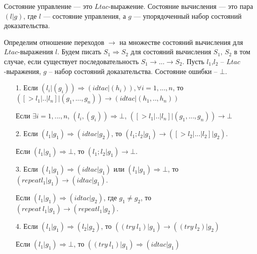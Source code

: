 \documentclass[12pt]{article}
\begin{document}
Состояние управление — это  $Ltac$-выражение. Состояние вычисления — это пара $(l | g)$, где $l$ — состояние управления, а $g$ — упорядоченный набор состояний доказательства.

Определим отношение переходов $\xrightarrow{}$ на множестве состояний вычисления для $Ltac$-выражения $l$.
Будем писать $S_1 \Rightarrow S_2$ для состояний вычисления $S_1$, $S_2$ в том случае, если существует последовательность $S_1 \xrightarrow{} ... \xrightarrow{} S_2$.
Пусть $l_1$,$l_2$ -- $Ltac$-выражения, $g$ -- набор состояний доказательства. Состояние ошибки -- $\bot$.

\begin{enumerate}
    \item[1.] Если  $(l_i|(g_i)) \Rightarrow (idtac|(h_i)), \forall i = 1,...,n$, то $([>l_1|..|l_n]|(g_1,...,g_n)) \xrightarrow{} (idtac|(h_1,..,h_n))$
    \item[  ] Если $\exists i=1,...,n$, $(l_i, (g_i)) \Rightarrow \bot$, $([>l_1|..|l_n]|(g_1,...,g_n)) \xrightarrow{} \bot$
    \item[2.] Если $(l_1|g_1) \Rightarrow (idtac|g_2)$, то $(l_1;l_2|g_1) \xrightarrow{} ([>l_2|...|l_2]|g_2)$.
    \item[  ] Если $(l_1|g_1) \Rightarrow \bot$, то $(l_1;l_2|g_1) \xrightarrow{} \bot$.
    \item[3.] Если $(l_1|g_1) \Rightarrow (idtac|g_1)$ или $(l_1|g_1) \Rightarrow \bot$, то $(repeat l_1|g_1) \xrightarrow{} (idtac|g_1)$.
    \item[  ] Если $(l_1|g_1) \Rightarrow (idtac|g_2)$, где $g_1 \neq g_2$, то $(repeat\ l_1|g_1) \xrightarrow{} (repeat l_1|g_2)$.
    
    \item[4.] Если $(l_1|g_1) \Rightarrow (l_2|g_2)$, то
    $((try\ l_1)| g_1) \xrightarrow{} ((try\ l_2)| g_2)$
    \item[]   Если $(l_1|g_1) \Rightarrow{} \bot$, то
    $((try\ l_1)| g_1) \Rightarrow{} (idtac| g_1)$
    

\end{enumerate}
\end{document}

